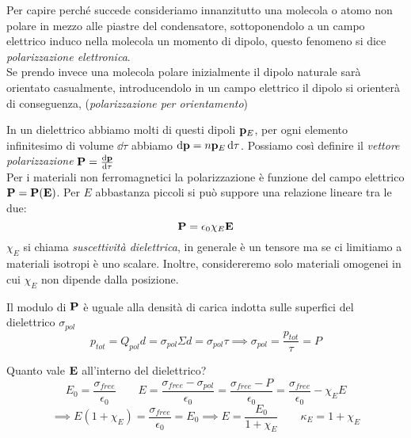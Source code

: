 \documentclass[12pt,a4paper]{article}
\begin{document}
Per capire perché succede consideriamo innanzitutto una molecola o atomo non polare in mezzo alle piastre del condensatore,
sottoponendolo a un campo elettrico induco nella molecola un momento di dipolo, questo fenomeno si dice \textit{polarizzazione elettronica}.
\\Se prendo invece una molecola polare inizialmente il dipolo naturale sarà orientato casualmente, introducendolo in un campo elettrico
il dipolo si orienterà di conseguenza, (\textit{polarizzazione per orientamento})


In un dielettrico abbiamo molti di questi dipoli $\vb{p}_E$, per ogni elemento infinitesimo di volume $\dd{\tau}$ abbiamo $\dd{\vb{p}}= n \vb{p}_E\dd{\tau}$.
Possiamo così definire il \textit{vettore polarizzazione} $\vb{P}=\dv{\vb{p}}{\tau}$
\\Per i materiali non ferromagnetici la polarizzazione è funzione del campo elettrico $\vb{P}= \vb{P}(\vb{E})$. Per $E$ abbastanza piccoli
si può suppore una relazione lineare tra le due:
\begin{equation*}
    \vb{P}= \epsilon_0\chi_E\vb{E}
\end{equation*}
$\chi_E$ si chiama \textit{suscettività dielettrica}, in generale è un tensore ma se ci limitiamo a materiali isotropi è uno scalare.
Inoltre, considereremo solo materiali omogenei in cui $\chi_E$ non dipende dalla posizione.

Il modulo di $\vb{P}$ è uguale alla densità di carica indotta sulle superfici del dielettrico $\sigma_{pol}$
\begin{equation*}
    p_{tot}= Q_{pol}d= \sigma_{pol}\Sigma d= \sigma_{pol}\tau \implies \sigma_{pol}= \frac{p_{tot}}{\tau}= P
\end{equation*}

Quanto vale $\vb{E}$ all'interno del dielettrico?
\begin{equation*}
    E_0= \frac{\sigma_{free}}{\epsilon_0}\qquad E = \frac{\sigma_{free}-\sigma_{pol}}{\epsilon_0}=\frac{\sigma_{free}-P}{\epsilon_0}
    = \frac{\sigma_{free}}{\epsilon_0}-\chi_EE 
\end{equation*}
\begin{equation*}
    \implies E(1+ \chi_E)= \frac{\sigma_{free}}{\epsilon_0}= E_0 \implies E = \frac{E_0}{1+ \chi_E}\qquad \kappa_E= 1+ \chi_E
\end{equation*}
\end{document}
